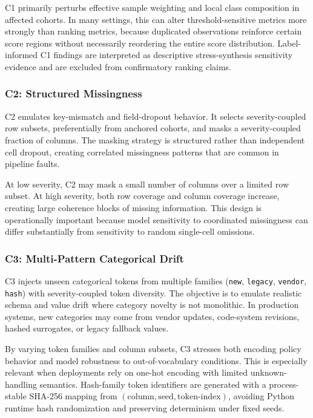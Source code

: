 \documentclass{AuthorGuide/ijitcs}
\begin{document}
C1 primarily perturbs effective sample weighting and local class composition in affected cohorts. In many settings, this can alter threshold-sensitive metrics more strongly than ranking metrics, because duplicated observations reinforce certain score regions without necessarily reordering the entire score distribution. Label-informed C1 findings are interpreted as descriptive stress-synthesis sensitivity evidence and are excluded from confirmatory ranking claims.

\subsubsection{C2: Structured Missingness}
C2 emulates key-mismatch and field-dropout behavior. It selects severity-coupled row subsets, preferentially from anchored cohorts, and masks a severity-coupled fraction of columns. The masking strategy is structured rather than independent cell dropout, creating correlated missingness patterns that are common in pipeline faults.

At low severity, C2 may mask a small number of columns over a limited row subset. At high severity, both row coverage and column coverage increase, creating large coherence blocks of missing information. This design is operationally important because model sensitivity to coordinated missingness can differ substantially from sensitivity to random single-cell omissions.

\subsubsection{C3: Multi-Pattern Categorical Drift}
C3 injects unseen categorical tokens from multiple families (\texttt{new}, \texttt{legacy}, \texttt{vendor}, \texttt{hash}) with severity-coupled token diversity. The objective is to emulate realistic schema and value drift where category novelty is not monolithic. In production systems, new categories may come from vendor updates, code-system revisions, hashed surrogates, or legacy fallback values.

By varying token families and column subsets, C3 stresses both encoding policy behavior and model robustness to out-of-vocabulary conditions. This is especially relevant when deployments rely on one-hot encoding with limited unknown-handling semantics. Hash-family token identifiers are generated with a process-stable SHA-256 mapping from $(\text{column},\text{seed},\text{token-index})$, avoiding Python runtime hash randomization and preserving determinism under fixed seeds.
\end{document}
